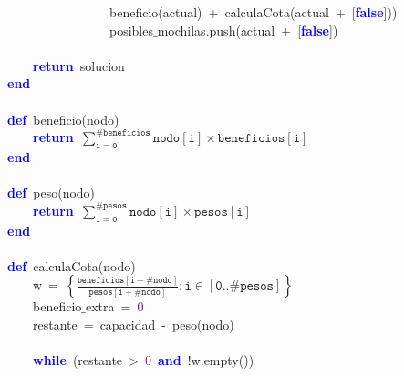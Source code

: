 \mbox{}\ \ \ \ \ \ \ \ \ \ \ \ \ \ \ \ \ \ \ \ beneficio\textcolor{BrickRed}{(}actual\textcolor{BrickRed}{)}\ \textcolor{BrickRed}{+}\ calculaCota\textcolor{BrickRed}{(}actual\ \textcolor{BrickRed}{+}\ \textcolor{BrickRed}{[}\textbf{\textcolor{Blue}{false}}\textcolor{BrickRed}{]))} \\
\mbox{}\ \ \ \ \ \ \ \ \ \ \ \ \ \ \ \ \ \ \ \ posibles$\_$mochilas\textcolor{BrickRed}{.}push\textcolor{BrickRed}{(}actual\ \textcolor{BrickRed}{+}\ \textcolor{BrickRed}{[}\textbf{\textcolor{Blue}{false}}\textcolor{BrickRed}{])} \\
\mbox{} \\
\mbox{}\ \ \ \ \ \ \ \ \textbf{\textcolor{Blue}{return}}\ solucion \\
\mbox{}\ \ \ \ \textbf{\textcolor{Blue}{end}} \\
\mbox{} \\
\mbox{}\ \ \ \ \textbf{\textcolor{Blue}{def}}\ beneficio\textcolor{BrickRed}{(}nodo\textcolor{BrickRed}{)} \\
\mbox{}\ \ \ \ \ \ \ \ \textbf{\textcolor{Blue}{return}}\ $\mathtt{\sum_{i=0}^{\#beneficios} nodo[i]\times beneficios[i]}$ \\
\mbox{}\ \ \ \ \textbf{\textcolor{Blue}{end}} \\
\mbox{} \\
\mbox{}\ \ \ \ \textbf{\textcolor{Blue}{def}}\ peso\textcolor{BrickRed}{(}nodo\textcolor{BrickRed}{)} \\
\mbox{}\ \ \ \ \ \ \ \ \textbf{\textcolor{Blue}{return}}\ $\mathtt{\sum_{i=0}^{\#pesos} nodo[i]\times pesos[i]}$ \\
\mbox{}\ \ \ \ \textbf{\textcolor{Blue}{end}} \\
\mbox{} \\
\mbox{}\ \ \ \ \textbf{\textcolor{Blue}{def}}\ calculaCota\textcolor{BrickRed}{(}nodo\textcolor{BrickRed}{)} \\
\mbox{}\ \ \ \ \ \ \ \ w\ \textcolor{BrickRed}{=}\ $\mathtt{\left\{\frac{beneficios[i+\#nodo]}{pesos[i+\#nodo]} : i \in [0..\#pesos]\right\}} $ \\
\mbox{}\ \ \ \ \ \ \ \ beneficio$\_$extra\ \textcolor{BrickRed}{=}\ \textcolor{Purple}{0} \\
\mbox{}\ \ \ \ \ \ \ \ restante\ \textcolor{BrickRed}{=}\ capacidad\ \textcolor{BrickRed}{-}\ peso\textcolor{BrickRed}{(}nodo\textcolor{BrickRed}{)} \\
\mbox{} \\
\mbox{}\ \ \ \ \ \ \ \ \textbf{\textcolor{Blue}{while}}\ \textcolor{BrickRed}{(}restante\ \textcolor{BrickRed}{\textgreater{}}\ \textcolor{Purple}{0}\ \textbf{\textcolor{Blue}{and}}\ \textcolor{BrickRed}{!}w\textcolor{BrickRed}{.}empty\textcolor{BrickRed}{())} \\
